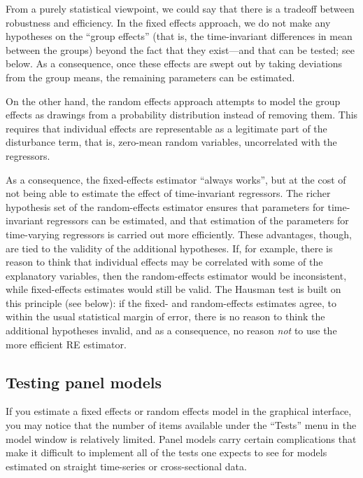 From a purely statistical viewpoint, we could say that there is a
tradeoff between robustness and efficiency. In the fixed effects
approach, we do not make any hypotheses on the ``group effects'' (that
is, the time-invariant differences in mean between the groups) beyond
the fact that they exist---and that can be tested; see below. As a
consequence, once these effects are swept out by taking deviations
from the group means, the remaining parameters can be estimated.

On the other hand, the random effects approach attempts to model the
group effects as drawings from a probability distribution instead of
removing them. This requires that individual effects are representable
as a legitimate part of the disturbance term, that is, zero-mean
random variables, uncorrelated with the regressors.

As a consequence, the fixed-effects estimator ``always works'', but at
the cost of not being able to estimate the effect of time-invariant
regressors.  The richer hypothesis set of the random-effects estimator
ensures that parameters for time-invariant regressors can be
estimated, and that estimation of the parameters for time-varying
regressors is carried out more efficiently.  These advantages, though,
are tied to the validity of the additional hypotheses. If, for
example, there is reason to think that individual effects may be
correlated with some of the explanatory variables, then the
random-effects estimator would be inconsistent, while fixed-effects
estimates would still be valid.  The Hausman test is built on this
principle (see below): if the fixed- and random-effects estimates
agree, to within the usual statistical margin of error, there is no
reason to think the additional hypotheses invalid, and as a
consequence, no reason \textit{not} to use the more efficient RE
estimator.

\subsection{Testing panel models}
\label{panel-tests}

If you estimate a fixed effects or random effects model in the
graphical interface, you may notice that the number of items available
under the ``Tests'' menu in the model window is relatively limited.
Panel models carry certain complications that make it difficult to
implement all of the tests one expects to see for models estimated on
straight time-series or cross-sectional data.  

